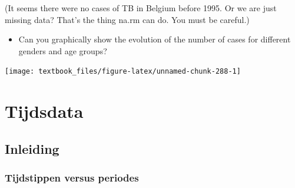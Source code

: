 \documentclass[]{tufte-book}
\newenvironment{Shaded}{}{}
\newcommand{\DataTypeTok}[1]{\textcolor[rgb]{0.56,0.13,0.00}{#1}}
\newcommand{\DecValTok}[1]{\textcolor[rgb]{0.25,0.63,0.44}{#1}}
\newcommand{\KeywordTok}[1]{\textcolor[rgb]{0.00,0.44,0.13}{\textbf{#1}}}
\newcommand{\NormalTok}[1]{#1}
\newcommand{\OperatorTok}[1]{\textcolor[rgb]{0.40,0.40,0.40}{#1}}
\newcommand{\StringTok}[1]{\textcolor[rgb]{0.25,0.44,0.63}{#1}}
\providecommand{\tightlist}{%
  \setlength{\itemsep}{0pt}\setlength{\parskip}{0pt}}
\begin{document}
(It seems there were no cases of TB in Belgium before 1995. Or we are just missing data? That's the thing na.rm can do. You must be careful.)

\begin{itemize}
\tightlist
\item
  Can you graphically show the evolution of the number of cases for different genders and age groups?
\end{itemize}

\begin{Shaded}
\end{Shaded}

\texttt{[image: textbook\_files/figure-latex/unnamed-chunk-288-1]}

\hypertarget{tijdsdata}{%
\chapter{Tijdsdata}\label{tijdsdata}}

\hypertarget{inleiding-1}{%
\section{Inleiding}\label{inleiding-1}}

\hypertarget{tijdstippen-versus-periodes}{%
\subsection{Tijdstippen versus periodes}\label{tijdstippen-versus-periodes}}
\end{document}

